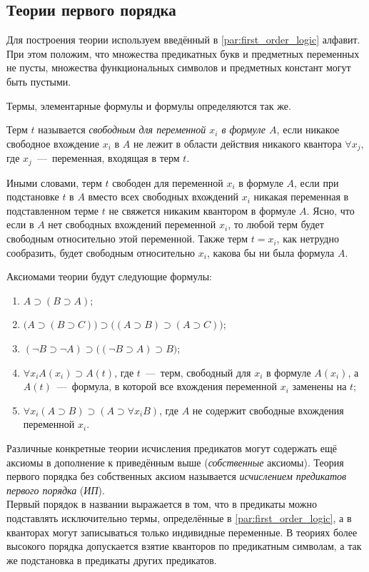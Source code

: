 \subsection{Теории первого порядка}
Для построения теории используем введённый в \ref{par:first_order_logic} алфавит. При этом положим, что множества предикатных букв и предметных переменных не пусты, множества функциональных символов и предметных констант могут быть пустыми.

Термы, элементарные формулы и формулы определяются так же.

\begin{definition*}
    Терм $t$ называется \textit{свободным для переменной $x_i$ в формуле $A$}, если никакое свободное вхождение $x_i$ в $A$ не лежит в области действия никакого квантора $\forall x_j$, где $x_j$~---~переменная, входящая в терм $t$.
\end{definition*}
Иными словами, терм $t$ свободен для переменной $x_i$ в формуле $A$, если при подстановке $t$ в $A$ вместо всех свободных вхождений $x_i$ никакая переменная в подставленном терме $t$ не свяжется никаким квантором в формуле $A$. Ясно, что если в $A$ нет свободных вхождений переменной $x_i$, то любой терм будет свободным относительно этой переменной. Также терм $t = x_i$, как нетрудно сообразить, будет свободным относительно $x_i$, какова бы ни была формула $A$.

Аксиомами теории будут следующие формулы:
\begin{enumerate}[label=(А\arabic*)]
    \item $A \supset (B \supset A)$;
    \item $\big(A \supset (B \supset C)\big) \supset \big((A \supset B) \supset (A \supset C)\big)$;
    \item $(\neg B \supset \neg A) \supset \big((\neg B \supset A) \supset B\big)$;
    \item $\forall x_iA(x_i) \supset A(t)$, где $t$~---~терм, свободный для $x_i$ в формуле $A(x_i)$, а $A(t)$~---~формула, в которой все вхождения переменной $x_i$ заменены на $t$;
    \item $\forall x_i(A \supset B) \supset (A \supset \forall x_iB)$, где $A$ не содержит свободные вхождения переменной $x_i$.
\end{enumerate}
Различные конкретные теории исчисления предикатов могут содержать ещё аксиомы в дополнение к приведённым выше (\textit{собственные} аксиомы). Теория первого порядка без собственных аксиом называется \textit{исчислением предикатов первого порядка} (\textit{ИП}). \\
Первый порядок в названии выражается в том, что в предикаты можно подставлять исключительно термы, определённые в \ref{par:first_order_logic}, а в кванторах могут записываться только индивидные переменные. В теориях более высокого порядка допускается взятие кванторов по предикатным символам, а так же подстановка в предикаты других предикатов.

